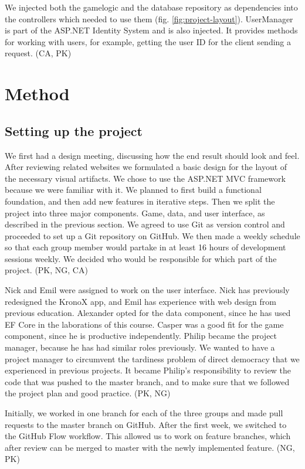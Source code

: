 \documentclass[acmlarge, review=false, screen=true]{acmart}
\begin{document}
We injected both the gamelogic and the database repository as dependencies into the controllers which needed to use them (fig. \ref{fig:project-layout}). UserManager is part of the ASP.NET Identity System and is also injected. It provides methods for working with users, for example, getting the user ID for the client sending a request. (CA, PK)



\section{Method}
  \subsection{Setting up the project}
    We first had a design meeting, discussing how the end result should look and feel. After reviewing related websites we formulated a basic design for the layout of the necessary visual artifacts. We chose to use the ASP.NET MVC framework because we were familiar with it. We planned to first build a functional foundation, and then add new features in iterative steps. Then we split the project into three major components. Game, data, and user interface, as described in the previous section. We agreed to use Git as version control and proceeded to set up a Git repository on GitHub. We then made a weekly schedule so that each group member would partake in at least 16 hours of development sessions weekly. We decided who would be responsible for which part of the project. (PK, NG, CA)

    Nick and Emil were assigned to work on the user interface. Nick has previously redesigned the KronoX app, and Emil has experience with web design from previous education\cite{nick}. Alexander opted for the data component, since he has used EF Core in the laborations of this course. Casper was a good fit for the game component, since he is productive independently. Philip became the project manager, because he has had similar roles previously. We wanted to have a project manager to circumvent the tardiness problem of direct democracy that we experienced in previous projects. It became Philip’s responsibility to review the code that was pushed to the master branch, and to make sure that we followed the project plan and  good practice. (PK, NG)

    Initially, we worked in one branch for each of the three groups and made pull requests to the master branch on GitHub. After the first week, we switched to the GitHub Flow workflow\cite{githubflow}. This allowed us to work on feature branches, which after review can be merged to master with the newly implemented feature. (NG, PK)
\end{document}
